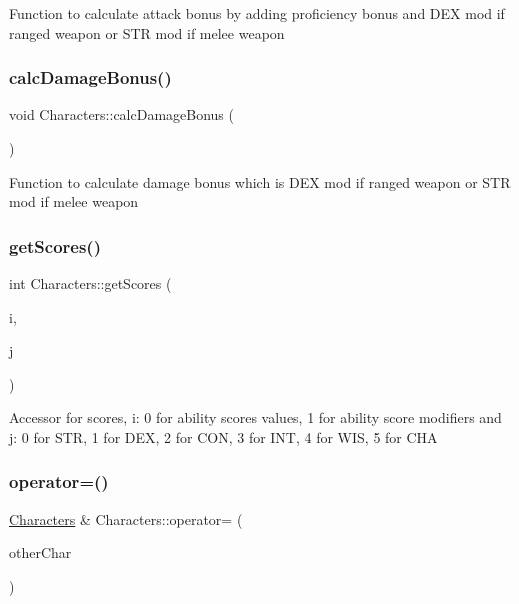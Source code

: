 Function to calculate attack bonus by adding proficiency bonus and D\+EX mod if ranged weapon or S\+TR mod if melee weapon \hypertarget{class_characters_af750209704e0be8b911cbc29fc1362ee}{}\label{class_characters_af750209704e0be8b911cbc29fc1362ee} 
\subsubsection{\texorpdfstring{calc\+Damage\+Bonus()}{calcDamageBonus()}}
{\footnotesize\ttfamily void Characters\+::calc\+Damage\+Bonus (\begin{DoxyParamCaption}{ }\end{DoxyParamCaption})}

Function to calculate damage bonus which is D\+EX mod if ranged weapon or S\+TR mod if melee weapon \hypertarget{class_characters_a498fb8e0caaa6503fbb1e1694a082c4c}{}\label{class_characters_a498fb8e0caaa6503fbb1e1694a082c4c} 
\subsubsection{\texorpdfstring{get\+Scores()}{getScores()}}
{\footnotesize\ttfamily int Characters\+::get\+Scores (\begin{DoxyParamCaption}\item[{int}]{i,  }\item[{int}]{j }\end{DoxyParamCaption})}

Accessor for scores, i\+: 0 for ability scores values, 1 for ability score modifiers and j\+: 0 for S\+TR, 1 for D\+EX, 2 for C\+ON, 3 for I\+NT, 4 for W\+IS, 5 for C\+HA \hypertarget{class_characters_a161bd4230b1ff594c36db697ee2d3707}{}\label{class_characters_a161bd4230b1ff594c36db697ee2d3707} 
\subsubsection{\texorpdfstring{operator=()}{operator=()}}
{\footnotesize\ttfamily \hyperlink{class_characters}{Characters} \& Characters\+::operator= (\begin{DoxyParamCaption}\item[{const \hyperlink{class_characters}{Characters} $\ast$}]{other\+Char }\end{DoxyParamCaption})}

